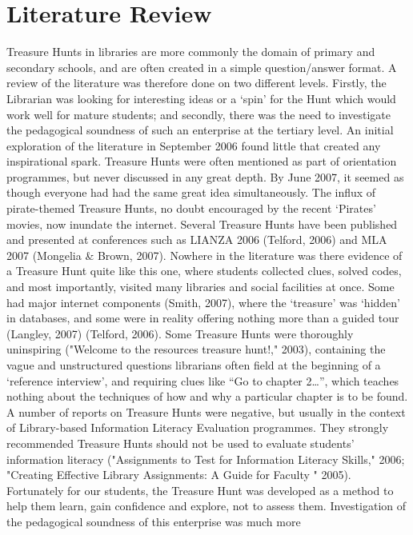 \chapter{Literature Review}

Treasure Hunts in libraries are more commonly the domain of primary and secondary 
schools, and are often created in a simple question/answer format. A review of the 
literature was therefore done on two different levels. Firstly, the Librarian was looking for 
interesting ideas or a ‘spin’ for the Hunt which would work well for mature students; and 
secondly, there was the need to investigate the pedagogical soundness of such an 
enterprise at the tertiary level. 
An initial exploration of the literature in September 2006 found little that created any 
inspirational spark. Treasure Hunts were often mentioned as part of orientation 
programmes, but never discussed in any great depth. By June 2007, it seemed as though 
everyone had had the same great idea simultaneously. The influx of pirate-themed 
Treasure Hunts, no doubt encouraged by the recent ‘Pirates’ movies, now inundate the 
internet. Several Treasure Hunts have been published and presented at conferences such 
as LIANZA 2006 (Telford, 2006) and MLA 2007 (Mongelia & Brown, 2007). Nowhere in the 
literature was there evidence of a Treasure Hunt quite like this one, where students 
collected clues, solved codes, and most importantly, visited many libraries and social 
facilities at once. Some had major internet components (Smith, 2007), where the 
‘treasure’ was ‘hidden’ in databases, and some were in reality offering nothing more than a 
guided tour (Langley, 2007) (Telford, 2006). Some Treasure Hunts were thoroughly 
uninspiring ("Welcome to the resources treasure hunt!," 2003), containing the vague and 
unstructured questions librarians often field at the beginning of a ‘reference interview’, and
requiring clues like “Go to chapter 2…”, which teaches nothing about the techniques of 
how and why a particular chapter is to be found. A number of reports on Treasure Hunts 
were negative, but usually in the context of Library-based Information Literacy Evaluation 
programmes. They strongly recommended Treasure Hunts should not be used to evaluate 
students’ information literacy ("Assignments to Test for Information Literacy Skills," 2006; 
"Creating Effective Library Assignments: A Guide for Faculty " 2005). Fortunately for our 
students, the Treasure Hunt was developed as a method to help them learn, gain 
confidence and explore, not to assess them. 
Investigation of the pedagogical soundness of this enterprise was much more 
